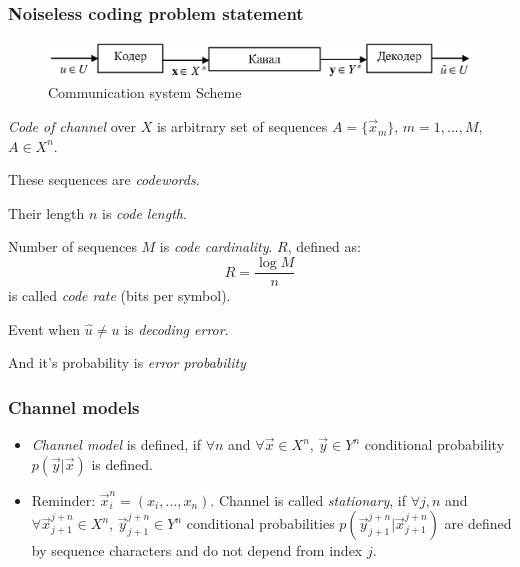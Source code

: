 \documentclass[14pt]{beamer}
\begin{document}
\begin{frame}
\frametitle{Noiseless coding problem statement}
\begin{itemize}
\small{

    \item
        \begin{figure}[ht]
        \begin{minipage}{1.0\linewidth}
        \includegraphics[width=1.0\textwidth]{fig5_1.eps}
        \caption{Communication system Scheme}
        \label{fig5_1}
        \end{minipage}
        \end{figure}

    \pause
    \item
        \textit{Code of channel} over $X$ is arbitrary set of sequences $A = \{{\vec x}_m \}$, $m = 1,...,M$, $A \in X^n$.
    \item
        These sequences are \textit{codewords}.
    \item
        Their length $n$ is \textit{code length}.
    \item
        Number of sequences $M$ is \textit{code cardinality}.
        $R$, defined as:
        \begin{equation}
            R = \frac{\log M}{n}
        \end{equation}
        is called \textit{code rate} (bits per symbol).
    \item
        Event when $\hat {u} \ne u$ is \textit{decoding error}.
    \item
        And it's probability is \textit{error probability}
}
\end{itemize}
\end{frame}



\begin{frame}
\frametitle{Channel models}
\begin{itemize}
\item
    \textit{Channel model} is defined, if $\forall  n$ and $\forall  {\vec x} \in X^n$, ${\vec y} \in Y^n$ conditional probability $p({\vec y}\vert {\vec x})$ is defined.

\pause \item
    Reminder: ${\vec x}_i^n = (x_i ,...,x_n )$.
    Channel is called \textit{stationary}, if $\forall  j, n $ and $ \forall {\vec x}_{j + 1}^{j + n} \in X^n$, ${\vec y}_{j + 1}^{j + n} \in Y^n$ conditional probabilities $p({\vec y}_{j + 1}^{j + n} \vert {\vec x}_{j + 1}^{j + n} )$ are defined by sequence characters and do not depend from index $j$.

\end{itemize}
\end{frame}
\end{document}
